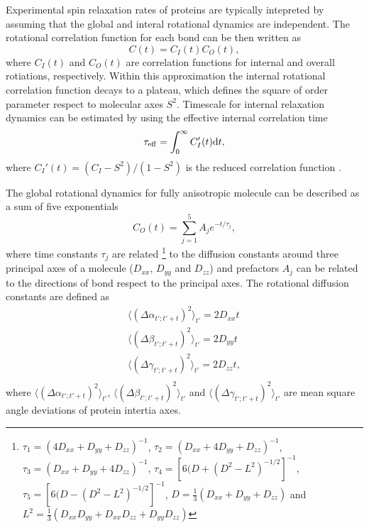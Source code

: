 \documentclass[pre,aps,floatfix,authordate1-4,twocolumn]{revtex4-1}
\begin{document}
Experimental spin relaxation rates of proteins are typically intepreted by
assuming that the global and interal rotational dynamics are independent.
The rotational correlation function for each bond can be then written as \cite{??}
\begin{equation}\label{CORRFsep}
  C(t)=C_I(t)C_O(t),
\end{equation}
where $C_I(t)$ and $C_O(t)$ are correlation functions for internal and overall
rotiations, respectively. Within this approximation 
the internal rotational correlation function decays to a plateau, which
defines the square of order parameter respect to molecular axes $S^2$.
Timescale for internal relaxation dynamics can be estimated by using the
effective internal correlation time 
\begin{equation}
  \tau_{\rm eff}=\int_0^\infty C_I'(t) \mathrm{d}t,
\end{equation}
where $C_I'(t)=(C_I-S^2)/(1-S^2)$ is the reduced correlation function \cite{??}.

The global rotational dynamics for fully anisotropic molecule
can be described as a sum of five exponentials \cite{woessner62,korzhnev01}
\begin{equation}\label{CORRFanisot}
  C_O(t)=\sum_{j=1}^5 A_j e^{-t/\tau_j},
\end{equation}
where time constants $\tau_j$ are related \footnote{
$\tau_1=(4D_{xx}+D_{yy}+D_{zz})^{-1}$,
$\tau_2=(D_{xx}+4D_{yy}+D_{zz})^{-1}$,
$\tau_3=(D_{xx}+D_{yy}+4D_{zz})^{-1}$,
$\tau_4=[6(D+(D^2-L^2)^{-1/2}]^{-1}$,
$\tau_5=[6(D-(D^2-L^2)^{-1/2}]^{-1}$,
$D=\frac{1}{3}(D_{xx}+D_{yy}+D_{zz})$ and 
$L^2=\frac{1}{3}(D_{xx}D_{yy}+D_{xx}D_{zz}+D_{yy}D_{zz})$} to
the diffusion constants around
three principal axes of a molecule
($D_{xx}$, $D_{yy}$ and $D_{zz}$)  and prefactors $A_j$
can be related to the directions of bond respect to the
principal axes.
The rotational diffusion constants are defined as 
\begin{equation}\label{DIFFdef}
  \begin{aligned}
    \langle (\Delta \alpha_{t';t'+t})^2 \rangle_{t'} = 2 D_{xx} t \\
    \langle (\Delta \beta_{t';t'+t})^2 \rangle_{t'} = 2 D_{yy} t \\
    \langle (\Delta \gamma_{t';t'+t})^2 \rangle_{t'} = 2 D_{zz} t, \\
  \end{aligned}
\end{equation}
where $\langle (\Delta \alpha_{t';t'+t})^2 \rangle_{t'}$,
$\langle (\Delta \beta_{t';t'+t})^2 \rangle_{t'}$ and
$\langle (\Delta \gamma_{t';t'+t})^2 \rangle_{t'}$ are mean
square angle deviations of protein intertia axes.
\end{document}
